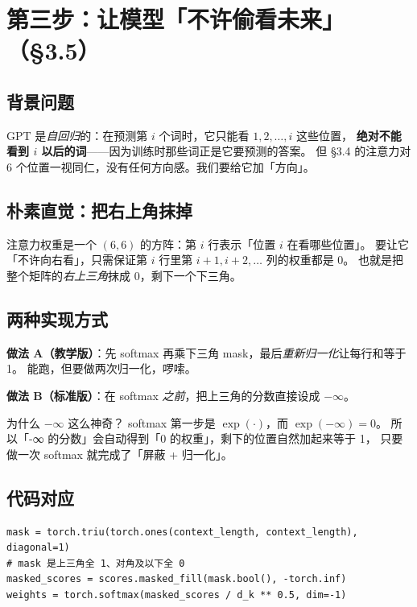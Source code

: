 \documentclass[11pt,a4paper]{ctexart}
\begin{document}
\section{第三步：让模型「不许偷看未来」（§3.5）}

\subsection{背景问题}

GPT 是\emph{自回归}的：在预测第 $i$ 个词时，它只能看 $1, 2, \dots, i$ 这些位置，
\textbf{绝对不能看到 $i$ 以后的词}——因为训练时那些词正是它要预测的答案。
但 §3.4 的注意力对 6 个位置一视同仁，没有任何方向感。我们要给它加「方向」。

\subsection{朴素直觉：把右上角抹掉}

\begin{intuitionblock}
注意力权重是一个 $(6, 6)$ 的方阵：第 $i$ 行表示「位置 $i$ 在看哪些位置」。
要让它「不许向右看」，只需保证第 $i$ 行里第 $i+1, i+2, \dots$ 列的权重都是 0。
也就是把整个矩阵的\emph{右上三角}抹成 0，剩下一个下三角。
\end{intuitionblock}

\subsection{两种实现方式}

\textbf{做法 A（教学版）}：先 softmax 再乘下三角 mask，最后\emph{重新归一化}让每行和等于 1。
能跑，但要做两次归一化，啰嗦。

\textbf{做法 B（标准版）}：在 softmax \emph{之前}，把上三角的分数直接设成 $-\infty$。

\begin{mathbox}{为什么 $-\infty$ 这么神奇？}
softmax 第一步是 $\exp(\cdot)$，而 $\exp(-\infty) = 0$。
所以「-∞ 的分数」会自动得到「0 的权重」，剩下的位置自然加起来等于 1，
只要做一次 softmax 就完成了「屏蔽 + 归一化」。
\end{mathbox}

\subsection{代码对应}

\begin{codebox}
\begin{lstlisting}
mask = torch.triu(torch.ones(context_length, context_length), diagonal=1)
# mask 是上三角全 1、对角及以下全 0
masked_scores = scores.masked_fill(mask.bool(), -torch.inf)
weights = torch.softmax(masked_scores / d_k ** 0.5, dim=-1)
\end{lstlisting}
\end{codebox}
\end{document}

